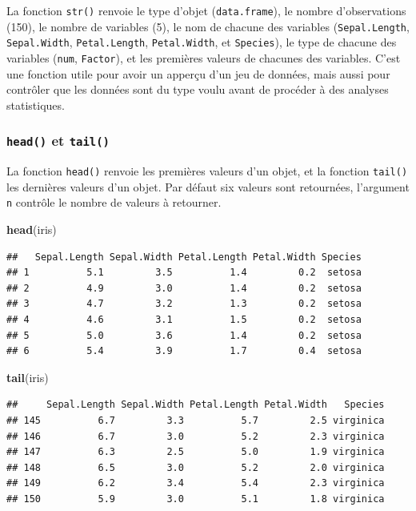 \documentclass[]{book}
\newenvironment{Shaded}{\begin{snugshade}}{\end{snugshade}}
\newcommand{\KeywordTok}[1]{\textcolor[rgb]{0.13,0.29,0.53}{\textbf{#1}}}
\newcommand{\NormalTok}[1]{#1}
\begin{document}
La fonction \texttt{str()} renvoie le type d'objet (\texttt{data.frame}), le nombre d'observations (150), le nombre de variables (5), le nom de chacune des variables (\texttt{Sepal.Length}, \texttt{Sepal.Width}, \texttt{Petal.Length}, \texttt{Petal.Width}, et \texttt{Species}), le type de chacune des variables (\texttt{num}, \texttt{Factor}), et les premières valeurs de chacunes des variables. C'est une fonction utile pour avoir un apperçu d'un jeu de données, mais aussi pour contrôler que les données sont du type voulu avant de procéder à des analyses statistiques.

\hypertarget{l015head}{%
\subsubsection{\texorpdfstring{\texttt{head()} et \texttt{tail()}}{head() et tail()}}\label{l015head}}

La fonction \texttt{head()} renvoie les premières valeurs d'un objet, et la fonction \texttt{tail()} les dernières valeurs d'un objet. Par défaut six valeurs sont retournées, l'argument \texttt{n} contrôle le nombre de valeurs à retourner.

\begin{Shaded}
\begin{Highlighting}[]
\KeywordTok{head}\NormalTok{(iris)}
\end{Highlighting}
\end{Shaded}

\begin{verbatim}
##   Sepal.Length Sepal.Width Petal.Length Petal.Width Species
## 1          5.1         3.5          1.4         0.2  setosa
## 2          4.9         3.0          1.4         0.2  setosa
## 3          4.7         3.2          1.3         0.2  setosa
## 4          4.6         3.1          1.5         0.2  setosa
## 5          5.0         3.6          1.4         0.2  setosa
## 6          5.4         3.9          1.7         0.4  setosa
\end{verbatim}

\begin{Shaded}
\begin{Highlighting}[]
\KeywordTok{tail}\NormalTok{(iris)}
\end{Highlighting}
\end{Shaded}

\begin{verbatim}
##     Sepal.Length Sepal.Width Petal.Length Petal.Width   Species
## 145          6.7         3.3          5.7         2.5 virginica
## 146          6.7         3.0          5.2         2.3 virginica
## 147          6.3         2.5          5.0         1.9 virginica
## 148          6.5         3.0          5.2         2.0 virginica
## 149          6.2         3.4          5.4         2.3 virginica
## 150          5.9         3.0          5.1         1.8 virginica
\end{verbatim}
\end{document}
